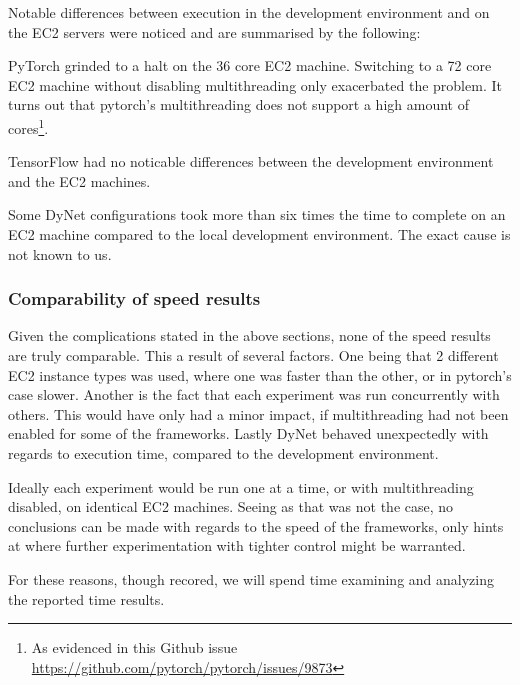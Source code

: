 Notable differences between execution in the development environment and on the
EC2 servers were noticed and are summarised by the following:

PyTorch grinded to a halt on the 36 core EC2 machine. Switching to a 72 core EC2
machine without disabling multithreading only exacerbated the problem. It turns
out that pytorch's multithreading does not support a high amount of
cores\footnote{As evidenced in this Github issue \url{https://github.com/pytorch/pytorch/issues/9873}}.

TensorFlow had no noticable differences between the development environment and
the EC2 machines.

Some DyNet configurations took more than six times the time to complete on an
EC2 machine compared to the local development environment. The exact cause is
not known to us.

\subsubsection{Comparability of speed results}

Given the complications stated in the above sections, none of the speed results
are truly comparable. This a result of several factors.
One being that 2 different EC2 instance types was used, where one was faster
than the other, or in pytorch's case slower.
Another is the fact that each experiment was run concurrently with others. This
would have only had a minor impact, if multithreading had not been enabled for
some of the frameworks.
Lastly DyNet behaved unexpectedly with regards to execution time, compared to the
development environment.

Ideally each experiment would be run one at a time, or with multithreading
disabled, on identical EC2 machines. Seeing as that was not the case, no
conclusions can be made with regards to the speed of the frameworks, only hints
at where further experimentation with tighter control might be warranted.

For these reasons, though recored, we will spend time examining and analyzing
the reported time results.

